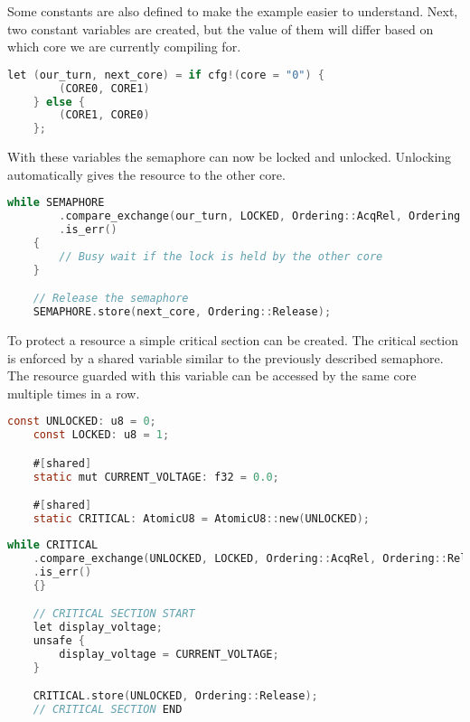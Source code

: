 Some constants are also defined to make the example easier to understand. Next, two constant variables are created, but the value of them will differ based on which core we are currently compiling for.

\begin{lstlisting}[language=C,frame=single,float=!ht,label={lst:sw-semaphore2},caption={Software Semaphore Core Specific Variables}]
    let (our_turn, next_core) = if cfg!(core = "0") {
        (CORE0, CORE1)
    } else {
        (CORE1, CORE0)
    };
\end{lstlisting}

With these variables the semaphore can now be locked and unlocked. Unlocking automatically gives the resource to the other core.

\begin{lstlisting}[language=C,frame=single,float=!ht,label={lst:sw-semaphore3},caption={Software Semaphore Locking and Unlocking}]
    while SEMAPHORE
        .compare_exchange(our_turn, LOCKED, Ordering::AcqRel, Ordering::Relaxed)
        .is_err()
    {
        // Busy wait if the lock is held by the other core
    }

    // Release the semaphore
    SEMAPHORE.store(next_core, Ordering::Release);
\end{lstlisting}

To protect a resource a simple critical section can be created. The critical section is enforced by a shared variable similar to the previously described semaphore. The resource guarded with this variable can be accessed by the same core multiple times in a row.

\begin{lstlisting}[language=C,frame=single,float=!ht,label={lst:sw-critical1},caption={Critical Section For a Variable}]
    const UNLOCKED: u8 = 0;
    const LOCKED: u8 = 1;

    #[shared]
    static mut CURRENT_VOLTAGE: f32 = 0.0;

    #[shared]
    static CRITICAL: AtomicU8 = AtomicU8::new(UNLOCKED);
\end{lstlisting}

\begin{lstlisting}[language=C,frame=single,float=!ht,label={lst:sw-critical2},caption={Performing a Read Operation in a Critical Section}]
    while CRITICAL
    .compare_exchange(UNLOCKED, LOCKED, Ordering::AcqRel, Ordering::Relaxed)
    .is_err()
    {}

    // CRITICAL SECTION START
    let display_voltage;
    unsafe {
        display_voltage = CURRENT_VOLTAGE;
    }

    CRITICAL.store(UNLOCKED, Ordering::Release);
    // CRITICAL SECTION END
\end{lstlisting}

